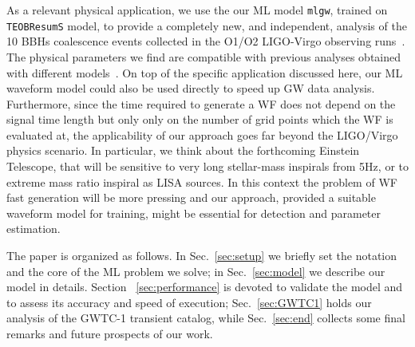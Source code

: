 As a relevant physical application, we use the our ML model \texttt{mlgw}, trained on \texttt{TEOBResumS} model, 
to provide a completely new, and independent, analysis of the 10 BBHs 
coalescence events collected in the O1/O2 LIGO-Virgo observing 
runs~\cite{LIGOScientific:2018mvr}.
The physical parameters we find are 
compatible with previous analyses obtained with different 
models~\cite{LIGOScientific:2018mvr}.
%
On top of the specific application discussed here, our ML waveform model could also be used directly 
to speed up GW data analysis.
Furthermore, since the time required to generate a WF does not depend
on the signal time length but only only on the number of grid points which the WF is evaluated at,
the applicability of our approach goes far beyond the LIGO/Virgo physics scenario. In particular,
we think about the forthcoming Einstein Telescope, that will be sensitive to very long stellar-mass 
inspirals from 5Hz, or to extreme mass ratio inspiral as LISA sources. In this context the problem
of WF fast generation will be more pressing and our approach, provided a suitable waveform model 
for training,  might be essential for detection and parameter estimation. 

The paper is organized as follows. In Sec.~\ref{sec:setup} we briefly set the 
notation and the core of the ML problem we solve; in Sec.~\ref{sec:model} we describe 
our model in details. Section ~\ref{sec:performance} is devoted to validate the model 
and to assess its accuracy and speed of execution; Sec.~\ref{sec:GWTC1} holds 
our analysis of the GWTC-1 transient catalog, while  Sec.~\ref{sec:end} collects 
some final remarks and future prospects of our work.

